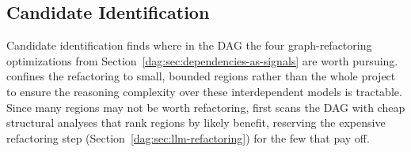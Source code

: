 

\subsection{Candidate Identification}
\label{dag:sec:candidate-identification}

Candidate identification finds where in the DAG  the four graph-refactoring optimizations from Section~\ref{dag:sec:dependencies-as-signals} are worth pursuing.
\dagsmith{} confines the refactoring to small, bounded regions rather than the whole project to ensure  the reasoning complexity over these interdependent models is tractable.
Since many regions may not be worth refactoring, \dagsmith{} first scans the  DAG with cheap structural analyses that rank regions by likely benefit, reserving the expensive refactoring step (Section~\ref{dag:sec:llm-refactoring}) for the few that pay off.

